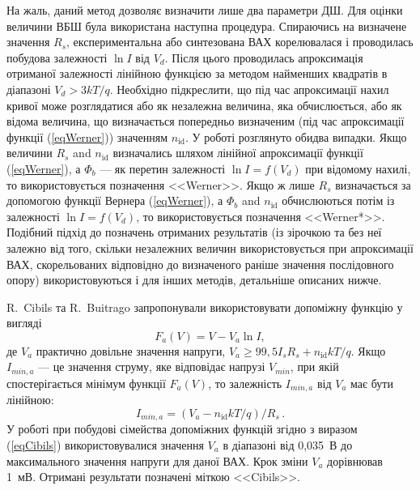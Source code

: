 На жаль, даний метод дозволяє визначити лише два параметри ДШ.
Для оцінки величини ВБШ була використана наступна процедура.
Спираючись на визначене значення $R_s$, експериментальна або синтезована ВАХ корелювалася і проводилась побудова залежності  $\ln I$ від $V_d$.
Після цього проводилась апроксимація отриманої залежності лінійною функцією за методом найменших квадратів \cite[с.~67]{KalitkinBook} в діапазоні $V_d>3kT/q$.
Необхідно підкреслити, що під час апроксимації нахил кривої може розглядатися або як незалежна величина, яка обчислюється, або як відома величина, що визначається попередньо визначеним (під час апроксимації функції (\ref{eqWerner})) значенням $n_\mathrm{id}$.
У роботі розглянуто обидва випадки.
Якщо величини $R_s$ and $n_\mathrm{id}$ визначались шляхом лінійної апроксимації функції (\ref{eqWerner}), а $\Phi_b$ --- як перетин залежності $\ln I=f(V_d)$ при відомому нахилі, то використовується позначення <<Werner>>.
Якщо ж лише $R_s$ визначається за допомогою функції Вернера (\ref{eqWerner}), а $\Phi_b$ and $n_\mathrm{id}$ обчислюються потім із залежності $\ln I=f(V_d)$, то використовується позначення <<Werner*>>.
Подібний підхід до позначень отриманих результатів (із зірочкою та без неї залежно від того, скільки незалежних величин використовується при апроксимації ВАХ, скорельованих відповідно до визначеного раніше значення послідовного опору) використовуються і для інших методів, детальніше описаних нижче.

R.~Cibils  та R.~Buitrago \cite{Cibils} запропонували використовувати допоміжну функцію у вигляді
\begin{equation}
\label{eqCibils}
F_a(V)=V-V_a\ln I,
\end{equation}
де
$V_a$ практично довільне значення напруги, $V_a\geq99,5I_sR_s+n_\mathrm{id}kT/q$.
Якщо $I_{min,a}$ --- це значення струму, яке відповідає напрузі $V_{min}$, при якій спостерігається мінімум функції $F_a(V)$,
то залежність $I_{min,a}$ від $V_a$ має бути \cite{Cibils} лінійною:
\begin{equation}
\label{eqCibilsDet}
I_{min,a}=(V_a-n_\mathrm{id}kT/q)/R_s\,.
\end{equation}
У роботі при побудові сімейства допоміжних функцій згідно з виразом (\ref{eqCibils}) використовувалися значення  $V_a$ в діапазоні від 0,035~В до максимального значення напруги для даної ВАХ.
Крок зміни $V_a$ дорівнював 1~мВ.
Отримані результати позначені міткою <<Cibils>>.

